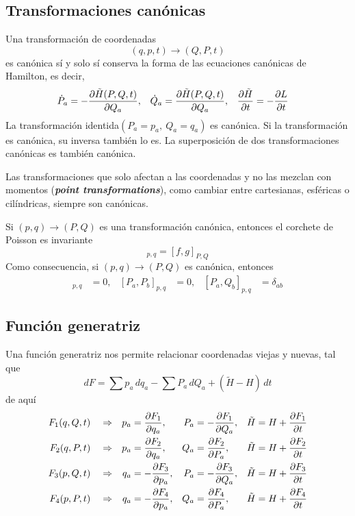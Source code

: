 \documentclass[]{article}
\numberwithin{equation}{section}
\begin{document}
\subsection{Transformaciones canónicas}
Una transformación de coordenadas
\begin{equation}
	(q,p,t) \to (Q,P,t)
\end{equation}
es canónica sí y solo sí conserva la forma de las ecuaciones canónicas de Hamilton, es decir,
\begin{align}
	\dot{P}_a &= - \dfrac{\partial \tilde{H}(P,Q,t)}{\partial Q_a}, & \dot{Q}_a &= \dfrac{\partial \tilde{H}(P,Q,t)}{\partial Q_a}, & \dfrac{\partial \tilde{H}}{\partial t} &= - \dfrac{\partial L}{\partial t}
\end{align}
La transformación identida$(P_a = p_a, ~ Q_a = q_a)$ es canónica. Si la transformación es canónica, su inversa también lo es. La superposición de dos transformaciones canónicas es también canónica.

Las transformaciones que solo afectan a las coordenadas y no las mezclan con momentos (\textbf{\textit{point transformations}}), como cambiar entre cartesianas, esféricas o cilíndricas, siempre son canónicas. 

Si $(p,q) \to (P,Q)$ es una transformación canónica, entonces el corchete de Poisson es invariante
\begin{equation}
	[f,g]_{p,q} = [f,g]_{P,Q}
\end{equation}
Como consecuencia, si $(p,q) \to (P,Q)$ es canónica, entonces
\begin{align}
	[Q_a,Q_b]_{p,q} &= 0, & [P_a,P_b]_{p,q} &= 0, & [P_a,Q_b]_{p,q} &= \delta_{ab}
\end{align}

\subsection{Función generatriz}
Una función generatriz nos permite relacionar coordenadas viejas y nuevas, tal que
\begin{equation}
	dF = \sum p_a \, dq_a - \sum P_a \, dQ_a + (\tilde{H} - H) \, dt
\end{equation}
de aquí
\begin{align}
	F_1(q,Q,t) &&& \Rightarrow & p_a &=  \dfrac{\partial F_1}{\partial q_a}, & P_a &= -\dfrac{\partial F_1}{\partial Q_a}, & \tilde{H} &= H + \dfrac{\partial F_1}{\partial t}\\
	F_2(q,P,t) &&& \Rightarrow & p_a &=  \dfrac{\partial F_2}{\partial q_a}, & Q_a &=  \dfrac{\partial F_2}{\partial P_a}, & \tilde{H} &= H + \dfrac{\partial F_2}{\partial t}\\
	F_3(p,Q,t) &&& \Rightarrow & q_a &= -\dfrac{\partial F_3}{\partial p_a}, & P_a &= -\dfrac{\partial F_3}{\partial Q_a}, & \tilde{H} &= H + \dfrac{\partial F_3}{\partial t}\\
	F_4(p,P,t) &&& \Rightarrow & q_a &= -\dfrac{\partial F_4}{\partial p_a}, & Q_a &=  \dfrac{\partial F_4}{\partial P_a}, & \tilde{H} &= H + \dfrac{\partial F_4}{\partial t}
\end{align}
\end{document}
